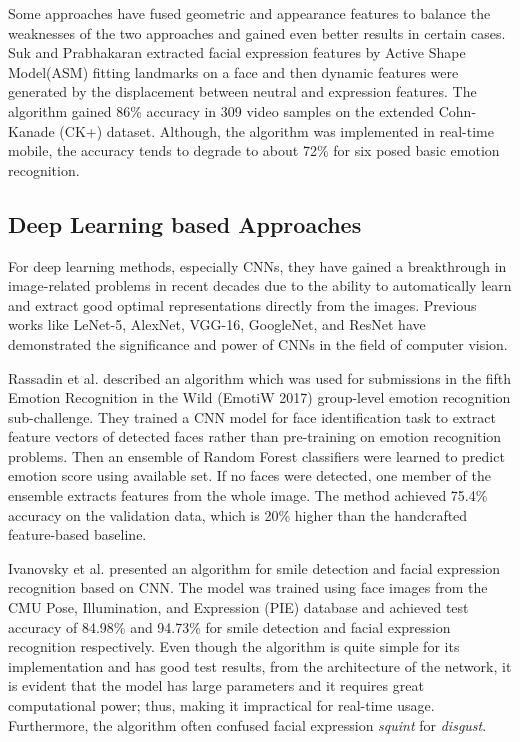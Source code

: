 \documentclass[master]{thesis-uestc}
\begin{document}
Some approaches have fused geometric and appearance features to balance the weaknesses of the two approaches and gained even better results in certain cases. Suk and Prabhakaran extracted facial expression features by Active Shape Model(ASM) fitting landmarks on a face and then dynamic features were generated by the displacement between neutral and expression features. The algorithm gained 86\% accuracy in 309 video samples on the extended Cohn-Kanade (CK+) dataset. Although, the algorithm was implemented in real-time mobile, the accuracy tends to degrade to about 72\% for six posed basic emotion recognition.

\subsection{Deep Learning based Approaches}
For deep learning methods, especially CNNs, they have gained a breakthrough in image-related problems in recent decades due to the ability to automatically learn and extract good optimal representations directly from the images. Previous works like LeNet-5, AlexNet, VGG-16, GoogleNet, and ResNet have demonstrated the significance and power of CNNs in the field of computer vision.

Rassadin et al. described an algorithm which was used for submissions in the fifth Emotion Recognition in the Wild (EmotiW 2017) group-level emotion recognition sub-challenge. They trained a CNN model for face identification task to extract feature vectors of detected faces rather than pre-training on emotion recognition problems. Then an ensemble of Random Forest classifiers were learned to predict emotion score using available set. If no faces were detected, one member of the ensemble extracts features from the whole image. The method achieved 75.4\% accuracy on the validation data, which is 20\% higher than the handcrafted feature-based baseline.

Ivanovsky et al. presented an algorithm for smile detection and facial expression recognition based on CNN. The model was trained using face images from the CMU Pose, Illumination, and Expression (PIE) database and achieved test accuracy of 84.98\% and 94.73\% for smile detection and facial expression recognition respectively. Even though the algorithm is quite simple for its implementation and has good test results, from the architecture of the network, it is evident that the model has large parameters and it requires great computational power; thus, making it impractical for real-time usage. Furthermore, the algorithm often confused facial expression \textit{squint} for \textit{disgust}.
\end{document}
